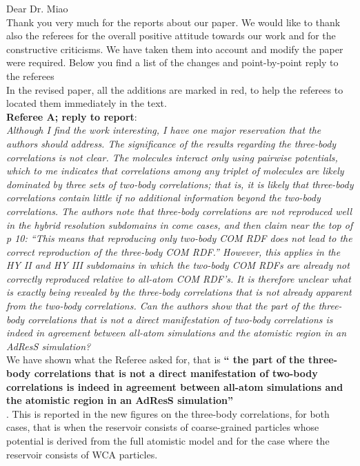 \documentclass[12pt]{article}
\begin{document}
\vspace{2cm}
Dear Dr. Miao\\
Thank you very much for the reports about our paper. We would like to thank also the referees for the overall positive attitude towards our work and for the constructive criticisms.
We have taken them into account and modify the paper were required. Below you find a list of the changes and point-by-point reply to the referees\\
In the revised paper, all the additions are marked in red, to help the referees to located them immediately in the text.\\
{\bf Referee A; reply to  report}:\\
{\color{red} {\it Although I find the work interesting, I have one major reservation that the authors should address. The
significance of the results regarding the three-body correlations is not clear. The molecules interact only
using pairwise potentials, which to me indicates that correlations among any triplet of molecules are likely
dominated by three sets of two-body correlations; that is, it is likely that three-body correlations contain
little if no additional information beyond the two-body correlations. The authors note that three-body
correlations are not reproduced well in the hybrid resolution subdomains in come cases, and then claim
near the top of p 10: “This means that reproducing only two-body COM RDF does not lead to the correct
reproduction of the three-body COM RDF.” However, this applies in the HY II and HY III subdomains in
which the two-body COM RDFs are already not correctly reproduced relative to all-atom COM RDF’s. It is
therefore unclear what is exactly being revealed by the three-body correlations that is not already apparent
from the two-body correlations. Can the authors show that the part of the three-body correlations that is
not a direct manifestation of two-body correlations is indeed in agreement between all-atom simulations
and the atomistic region in an AdResS simulation?}}\\
We have shown what the Referee asked for, that is {\bf `` the part of the three-body correlations that is
not a direct manifestation of two-body correlations is indeed in agreement between all-atom simulations
and the atomistic region in an AdResS simulation''}\\.
This is reported in the new figures on the three-body correlations, for both cases, that is when the reservoir consists of coarse-grained particles whose potential is derived from the full atomistic model and for the case where the reservoir consists of WCA particles.
\end{document}
